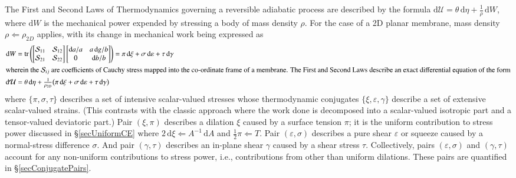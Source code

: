 The First and Second Laws of Thermo\-dynamics governing a reversible adiabatic process are described by the formula $\mathrm{d}\mathcal{U} = \theta \, \mathrm{d} \eta + \tfrac{1}{\rho} \, \mathrm{d}W$, where $\mathrm{d}W$ is the mechanical power expended by stressing a body of mass density $\rho$.  For the case of a 2D planar membrane, mass density $\rho \Leftarrow \rho_{2D}$ applies, with its change in mechanical work being expressed as \cite{Freedetal17,FreedZamani19}
\begin{subequations}
\begin{align}
\mathrm{d} W & = \mathrm{tr} \left( 
\begin{bmatrix}
\mathcal{S}_{11} & \mathcal{S}_{12} \\
\mathcal{S}_{21} & \mathcal{S}_{22}
\end{bmatrix} \begin{bmatrix}
\mathrm{d}a / a & a \, \mathrm{d} g / b \\
0 & \mathrm{d}b / b 
\end{bmatrix} \right) =  
\pi \, \mathrm{d} \xi + \sigma \, \mathrm{d} \varepsilon + 
\tau \, \mathrm{d} \gamma
\label{convectedWorkRate} \\
\intertext{wherein the $\mathcal{S}_{ij}$ are coefficients of Cauchy stress mapped into the co-ordinate frame of a membrane.  The First and Second Laws describe an exact differential equation of the form}
\mathrm{d} \mathcal{U} & = \theta \, \mathrm{d} \eta + \tfrac{1}{\rho_{2D}} 
\bigl( \pi \, \mathrm{d} \xi + \sigma \, \mathrm{d} \varepsilon + 
\tau \, \mathrm{d} \gamma \bigr)
\label{membraneThermo}
\end{align}
\end{subequations} 
where $\{ \pi , \sigma , \tau \}$ describes a set of intensive scalar-valued stresses whose thermo\-dynamic conjugates $\{ \xi , \varepsilon , \gamma \}$ describe a set of extensive scalar-valued strains.  (This contrasts with the classic approach where the work done is decomposed into a scalar-valued isotropic part and a tensor-valued deviatoric part.)  Pair $( \xi , \pi )$ describes a dilation $\xi$ caused by a surface tension $\pi$; it is the uniform contribution to stress power discussed in \S\ref{secUniformCE} where $2 \, \mathrm{d} \xi \Leftarrow A^{-1} \, \mathrm{d} A$ and $\tfrac{1}{2} \pi \Leftarrow T$.  Pair $( \varepsilon , \sigma )$ describes a pure shear $\varepsilon$ or squeeze caused by a normal-stress difference $\sigma$.  And pair $( \gamma , \tau )$ describes an in-plane shear $\gamma$ caused by a shear stress $\tau$. Collectively, pairs $( \varepsilon , \sigma )$ and $( \gamma , \tau )$ account for any non-uniform contributions to stress power, i.e., contributions from other than uniform dilations.  These pairs are quantified in \S\ref{secConjugatePairs}.

